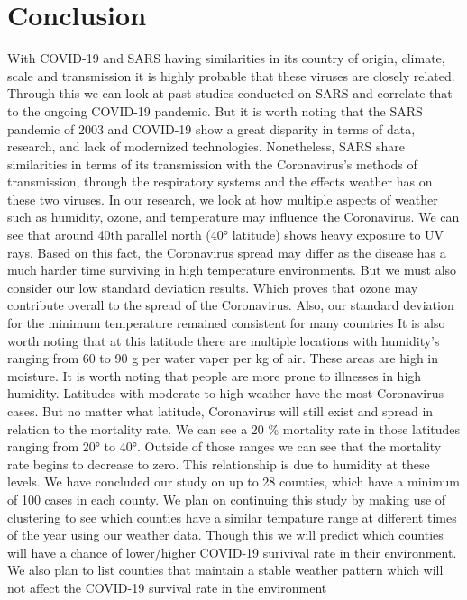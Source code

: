 \documentclass[10pt,journal,compsoc]{IEEEtran}
\begin{document}
{{{\section{Conclusion}
\label{sec: conclusion}

	With COVID-19 and SARS having similarities in its country of origin, climate, scale and transmission it is highly probable that these viruses are closely related. Through this we can look at past studies conducted on SARS and correlate that to the ongoing COVID-19 pandemic. But it is worth noting that the SARS pandemic of 2003 and COVID-19 show a great disparity in terms of data, research, and lack of modernized technologies. Nonetheless, SARS share similarities in terms of its transmission with the Coronavirus’s methods of transmission, through the respiratory systems and the effects weather has on these two viruses. In our research, we look at how multiple aspects of weather such as humidity, ozone, and temperature may influence the Coronavirus.
	We can see that around 40th parallel north (40° latitude) shows heavy exposure to UV rays. Based on this fact, the Coronavirus spread may differ as the disease has a much harder time surviving in high temperature environments. But we must also consider our low standard deviation results. Which proves that ozone may contribute overall to the spread of the Coronavirus. Also, our standard deviation for the minimum temperature remained consistent for many countries
	It is also worth noting that at this latitude there are multiple locations with humidity’s ranging from 60 to 90 g per water vaper per kg of air. These areas are high in moisture. It is worth noting that people are more prone to illnesses in high humidity. Latitudes with moderate to high weather have the most Coronavirus cases. But no matter what latitude, Coronavirus will still exist and spread in relation to the mortality rate. We can see a 20 \% mortality rate in those latitudes ranging from 20° to 40°. Outside of those ranges we can see that the mortality rate begins to decrease to zero. This relationship is due to humidity at these levels.
	We have concluded our study on up to 28 counties, which have a minimum of 100 cases in each county. We plan on continuing this study by making use of clustering to see which counties have a similar tempature range at different times of the year using our weather data. Though this we will predict which counties will have a chance of lower/higher COVID-19 surivival rate in their environment. We also plan to list counties that maintain a stable weather pattern which will not affect the COVID-19 survival rate in the environment
}}}
\end{document}
